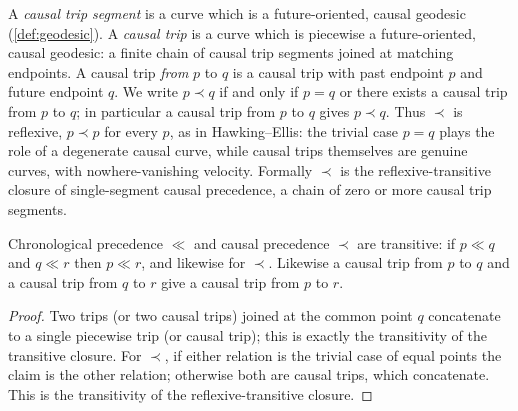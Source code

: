 \begin{definition}
    \label{def:causal-trip}
    \leanok
    A \textit{causal trip segment} is a curve which is a future-oriented, causal geodesic (\ref{def:geodesic}). A \textit{causal trip} is a curve which is piecewise a future-oriented, causal geodesic: a finite chain of causal trip segments joined at matching endpoints. A causal trip \textit{from} $p$ to $q$ is a causal trip with past endpoint $p$ and future endpoint $q$. We write $p \prec q$ if and only if $p = q$ or there exists a causal trip from $p$ to $q$; in particular a causal trip from $p$ to $q$ gives $p \prec q$. Thus $\prec$ is reflexive, $p \prec p$ for every $p$, as in Hawking--Ellis: the trivial case $p = q$ plays the role of a degenerate causal curve, while causal trips themselves are genuine curves, with nowhere-vanishing velocity. Formally $\prec$ is the reflexive-transitive closure of single-segment causal precedence, a chain of zero or more causal trip segments.
\end{definition}

\medskip

\begin{theorem}
    \label{thrm:precedence-transitive}
    \leanok
    Chronological precedence $\ll$ and causal precedence $\prec$ are transitive: if $p \ll q$ and $q \ll r$ then $p \ll r$, and likewise for $\prec$. Likewise a causal trip from $p$ to $q$ and a causal trip from $q$ to $r$ give a causal trip from $p$ to $r$.
\end{theorem}
\begin{proof}
    \leanok
    Two trips (or two causal trips) joined at the common point $q$ concatenate to a single piecewise trip (or causal trip); this is exactly the transitivity of the transitive closure. For $\prec$, if either relation is the trivial case of equal points the claim is the other relation; otherwise both are causal trips, which concatenate. This is the transitivity of the reflexive-transitive closure.
\end{proof}

